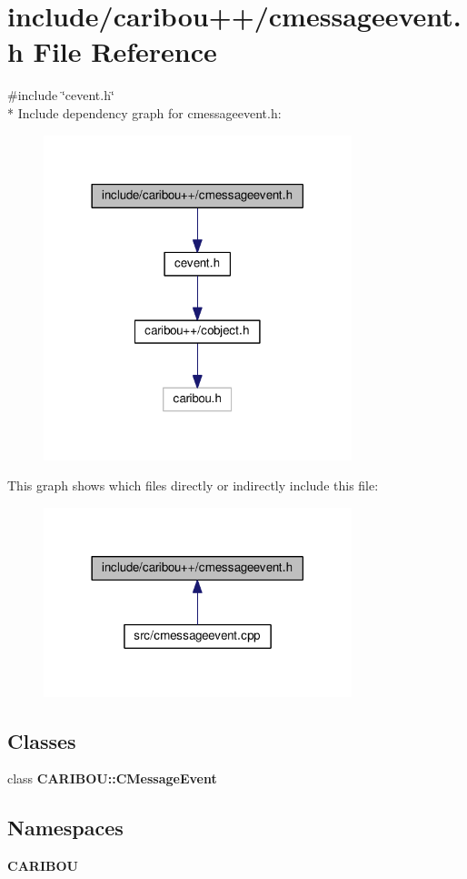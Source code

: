 \section{include/caribou++/cmessageevent.h File Reference}
\label{cmessageevent_8h}
{\ttfamily \#include \char`\"{}cevent.\+h\char`\"{}}\\*
Include dependency graph for cmessageevent.\+h\+:
\nopagebreak
\begin{figure}[H]
\begin{center}
\leavevmode
\includegraphics[width=254pt]{cmessageevent_8h__incl}
\end{center}
\end{figure}
This graph shows which files directly or indirectly include this file\+:
\nopagebreak
\begin{figure}[H]
\begin{center}
\leavevmode
\includegraphics[width=254pt]{cmessageevent_8h__dep__incl}
\end{center}
\end{figure}
\subsection*{Classes}
\begin{DoxyCompactItemize}
\item 
class {\bf C\+A\+R\+I\+B\+O\+U\+::\+C\+Message\+Event}
\end{DoxyCompactItemize}
\subsection*{Namespaces}
\begin{DoxyCompactItemize}
\item 
 {\bf C\+A\+R\+I\+B\+OU}
\end{DoxyCompactItemize}
